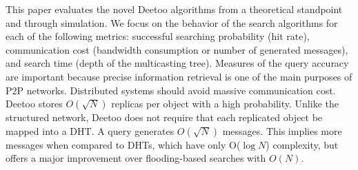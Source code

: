 \documentclass[conference]{IEEEtran}
\begin{document}
This paper evaluates the novel Deetoo algorithms from a theoretical 
standpoint and through simulation. 
We focus on the behavior of the search algorithms for each of the
following metrics: successful searching probability (hit rate),
communication cost (bandwidth consumption or number of
generated messages), and search time (depth of the multicasting tree). 
Measures of the query accuracy are important because precise information 
retrieval is one of the main purposes of P2P networks. 
Distributed systems should avoid massive communication cost. Deetoo stores 
$O(\sqrt{N})$ replicas per object with a high probability. 
Unlike the structured network, Deetoo does not require that each replicated object 
be mapped into a DHT.
A query generates $O(\sqrt{N})$ messages.
This implies more messages when compared to DHTs, which have only O($\log N$) complexity,
but offers a major improvement over flooding-based searches with
$O(N)$.
\end{document}
